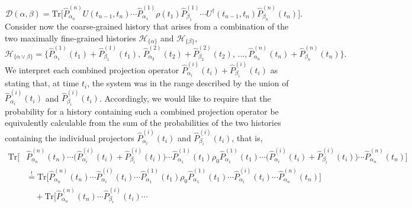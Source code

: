 \documentclass[twocolumn,rmp,aps,amsmath,amsfonts,noshowkeys,noshowpacs]{revtex4}
\begin{document}
\begin{widetext}

\begin{equation} \label{eq:dfs}
\mathcal{D}(\alpha,\beta) = \text{Tr} \big[
\widehat{P}^{(n)}_{\alpha_n} U(t_{n-1},t_n) 
 \cdots \widehat{P}^{(1)}_{\alpha_{1}}  \rho(t_1) 
\widehat{P}^{(1)}_{\beta_{1}} \cdots
U^\dagger(t_{n-1},t_n) \widehat{P}^{(n)}_{\beta_{n}}(t_n) \big].
\end{equation}
%
Consider now the coarse-grained history that arises from a combination
of the two maximally fine-grained histories $\mathcal{H}_{\{\alpha\}}$
and $\mathcal{H}_{\{\beta\}}$,
%
\begin{equation} \label{eq:hist-combined}
\mathcal{H}_{\{\alpha \lor \beta\}} = \{
\widehat{P}^{(1)}_{\alpha_1}(t_1)+ \widehat{P}^{(1)}_{\beta_1}(t_1),\,
\widehat{P}^{(2)}_{\alpha_2}(t_2) + \widehat{P}^{(2)}_{\beta_2}(t_2),\,
\dots,  \widehat{P}^{(n)}_{\alpha_n}(t_n) +
\widehat{P}^{(n)}_{\beta_n}(t_n) \}.   
\end{equation}
%
We interpret each combined projection operator
$\widehat{P}^{(i)}_{\alpha_i}(t_i)+ \widehat{P}^{(i)}_{\beta_i}(t_i)$
as stating that, at time $t_i$, the system was in the range described
by the union of $\widehat{P}^{(i)}_{\alpha_i}(t_i)$ and
$\widehat{P}^{(i)}_{\beta_i}(t_i)$. Accordingly, we would like to
require that the probability for a history containing such a combined
projection operator be equivalently calculable from the sum of the
probabilities of the two histories containing the individual
projectors $\widehat{P}^{(i)}_{\alpha_i}(t_i)$ and
$\widehat{P}^{(i)}_{\beta_i}(t_i)$, that is,
%
\begin{equation}
\begin{split}
%
\text{Tr} \big[ &
\widehat{P}^{(n)}_{\alpha_n}(t_n) 
\cdots \bigl(\widehat{P}^{(i)}_{\alpha_i}(t_i)+
\widehat{P}^{(i)}_{\beta_i}(t_i)\bigr) \cdots 
\widehat{P}^{(1)}_{\alpha_1}(t_1) \rho_0 \nonumber 
\widehat{P}^{(1)}_{\alpha_1}(t_1) \cdots \bigl(\widehat{P}^{(i)}_{\alpha_i}(t_i)+
\widehat{P}^{(i)}_{\beta_i}(t_i)\bigr) \cdots
\widehat{P}^{(n)}_{\alpha_n}(t_n) \big] \nonumber \\ &\stackrel{!}{=}
\text{Tr} \big[
\widehat{P}^{(n)}_{\alpha_n}(t_n) 
\cdots \widehat{P}^{(i)}_{\alpha_i}(t_i) \cdots 
\widehat{P}^{(1)}_{\alpha_1}(t_1) \rho_0\nonumber 
\widehat{P}^{(1)}_{\alpha_1}(t_1) \cdots \widehat{P}^{(i)}_{\alpha_i}(t_i) \cdots
\widehat{P}^{(n)}_{\alpha_n}(t_n)  \big] \nonumber \\ &\quad +
\text{Tr} \big[
\widehat{P}^{(n)}_{\alpha_n}(t_n) 
\cdots \widehat{P}^{(i)}_{\beta_i}(t_i) \cdots 

\end{split}
\end{equation}
\end{widetext}
\end{document}
